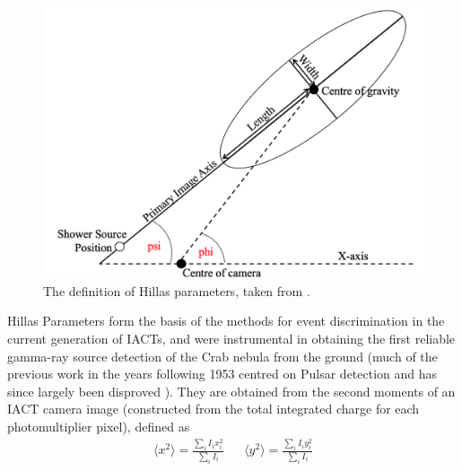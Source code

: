 \begin{figure}[ht] 
        \centering \includegraphics[width=\columnwidth]{figures/hillas.png}
        \caption{
                \label{fig:hillas} %
                The definition of Hillas parameters, taken from \cite{ctapipe}.
        }
\end{figure}
Hillas Parameters form the basis of the methods for event discrimination in the current generation of IACTs, and were instrumental in obtaining the first reliable gamma-ray source detection of the Crab nebula from the ground \cite{whipple} (much of the previous work in the years following 1953 centred on Pulsar detection and has since largely been disproved \cite{paulathesis}). They are obtained \cite{tomthesis} \cite{weekestev} from the second moments of an IACT camera image (constructed from the total integrated charge for each photomultiplier pixel), defined as 
\begin{align*}
\langle x^2 \rangle = \frac{\sum_i I_i x_i^2}{\sum_i I_i} && \langle y^2 \rangle = \frac{\sum_i I_i y_i^2}{\sum_i I_i}
\end{align*}
